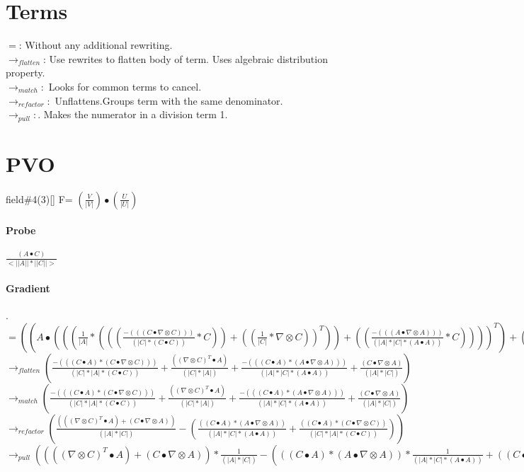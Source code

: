 \documentclass{article}
\begin{document}
\section{Terms}
$=$: Without any additional rewriting.\\
$\rightarrow_{flatten}$: Use rewrites to flatten body of term. Uses algebraic distribution property.\\
 $\rightarrow_{match}:$ Looks for common terms to cancel. \\
 $\rightarrow_{refactor}:$ Unflattens.Groups term with the same denominator.\\
 $\rightarrow_{pull}:$. Makes the numerator in a division term 1.
\section{PVO}
field\#4(3)[] F= $(\frac{V}{|V|})\bullet(\frac{U}{|U|})$
\paragraph{Probe} $  \frac{(A \bullet C)}{<||A||*||C||>}$
\paragraph{Gradient}.\\
$= ((A \bullet ((( \frac{1}{|A|}*((( \frac{-(((C \bullet  \nabla  \otimes C)))}{(|C|*(C \bullet C))}*C))+(( \frac{1}{|C|}* \nabla  \otimes C))^T))+(( \frac{-(((A \bullet  \nabla  \otimes A)))}{(|A|*|C|*(A \bullet A))}*C))))^T)+( \frac{1}{|A|}* \frac{1}{|C|}*(C \bullet  \nabla  \otimes A)))$
 \\
\newline $\rightarrow_{flatten}( \frac{-(((C \bullet A)*(C \bullet  \nabla  \otimes C)))}{(|C|*|A|*(C \bullet C))}+ \frac{(( \nabla  \otimes C)^T \bullet A)}{(|C|*|A|)}+ \frac{-(((C \bullet A)*(A \bullet  \nabla  \otimes A)))}{(|A|*|C|*(A \bullet A))}+ \frac{(C \bullet  \nabla  \otimes A)}{(|A|*|C|)})$\\
\newline $\rightarrow_{match}( \frac{-(((C \bullet A)*(C \bullet  \nabla  \otimes C)))}{(|C|*|A|*(C \bullet C))}+ \frac{(( \nabla  \otimes C)^T \bullet A)}{(|C|*|A|)}+ \frac{-(((C \bullet A)*(A \bullet  \nabla  \otimes A)))}{(|A|*|C|*(A \bullet A))}+ \frac{(C \bullet  \nabla  \otimes A)}{(|A|*|C|)})$\\
\newline $\rightarrow_{refactor}( \frac{((( \nabla  \otimes C)^T \bullet A)+(C \bullet  \nabla  \otimes A))}{(|A|*|C|)}-( \frac{((C \bullet A)*(A \bullet  \nabla  \otimes A))}{(|A|*|C|*(A \bullet A))}+ \frac{((C \bullet A)*(C \bullet  \nabla  \otimes C))}{(|C|*|A|*(C \bullet C))}))$\\
\newline $\rightarrow_{pull}(((( \nabla  \otimes C)^T \bullet A)+(C \bullet  \nabla  \otimes A))* \frac{1}{(|A|*|C|)}-(((C \bullet A)*(A \bullet  \nabla  \otimes A))* \frac{1}{(|A|*|C|*(A \bullet A))}+((C \bullet A)*(C \bullet  \nabla  \otimes C))* \frac{1}{(|C|*|A|*(C \bullet C))}))$
\end{document}
